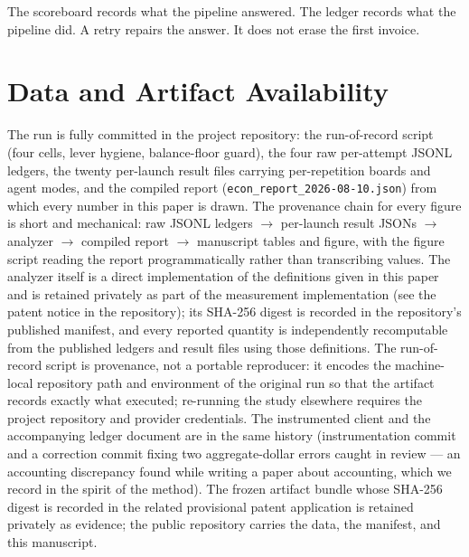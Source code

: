 \documentclass[11pt]{article}
\begin{document}
The scoreboard records what the pipeline answered. The ledger records
what the pipeline did. A retry repairs the answer. It does not erase
the first invoice.

\section*{Data and Artifact Availability}\label{sec:artifacts}

The run is fully committed in the project repository: the run-of-record
script (four cells, lever hygiene, balance-floor guard), the four raw
per-attempt JSONL ledgers, the twenty per-launch result files carrying
per-repetition boards and agent modes, and the compiled report
(\texttt{econ\_report\_2026-08-10.json}) from which every number
in this paper is drawn. The provenance chain for every figure is
short and mechanical: raw JSONL ledgers $\rightarrow$ per-launch
result JSONs $\rightarrow$ analyzer $\rightarrow$ compiled report
$\rightarrow$ manuscript tables and figure, with the figure script
reading the report programmatically rather than transcribing values.
The analyzer itself is a direct implementation of the definitions
given in this paper and is retained privately as part of the
measurement implementation (see the patent notice in the repository);
its SHA-256 digest is recorded in the repository's published manifest,
and every reported quantity is independently recomputable from the
published ledgers and result files using those definitions.
The run-of-record script is provenance, not a portable reproducer: it
encodes the machine-local repository path and environment of the
original run so that the artifact records exactly what executed;
re-running the study elsewhere requires the project repository and
provider credentials. The instrumented client and the accompanying
ledger document are in the same history (instrumentation commit and a
correction commit fixing two aggregate-dollar errors caught in review
--- an accounting discrepancy found while writing a paper about
accounting, which we record in the spirit of the method). The frozen
artifact bundle whose SHA-256 digest is recorded in the related
provisional patent application is retained privately as evidence; the
public repository carries the data, the manifest, and this manuscript.
\end{document}
